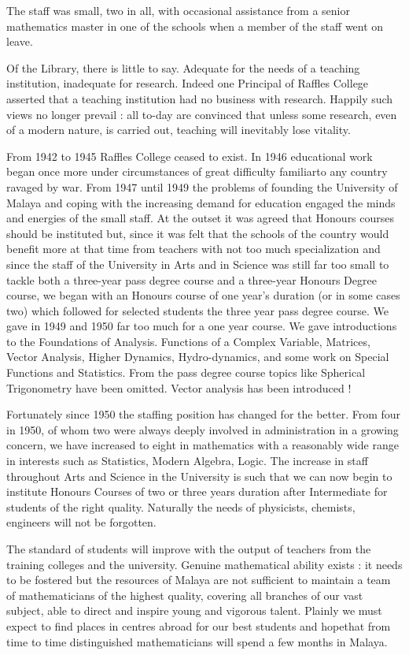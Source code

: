 The staff was small, two in all, with occasional assistance from a senior mathematics master in one of the schools when a member of the staff went on leave.

Of the Library, there is little to say. Adequate for the needs of a teaching institution, inadequate for research. Indeed one Principal of Raffles College asserted that a teaching institution had no business with research. Happily such views no longer prevail : all to-day are convinced that unless some research, even of a modern nature, is carried out, teaching will inevitably lose vitality.

From 1942 to 1945 Raffles College ceased to exist. In 1946 educational work began once more under circumstances of great difficulty familiar\pageoriginale to any country ravaged by war. From 1947 until 1949 the problems of founding the University of Malaya and coping with the increasing demand for education engaged the minds and energies of the small staff. At the outset it was agreed that Honours courses should be instituted but, since it was felt that the schools of the country would benefit more at that time from teachers with not too much specialization and since the staff of the University in Arts and in Science was still far too small to tackle both a three-year pass degree course and a three-year Honours Degree course, we began with an Honours course of one year's duration (or in some cases two) which followed for selected students the three year pass degree course. We gave in 1949 and 1950 far too much for a one year course. We gave introductions to the Foundations of Analysis. Functions of a Complex Variable, Matrices, Vector Analysis, Higher Dynamics, Hydro-dynamics, and some work on Special Functions and Statistics. From the pass degree course topics like Spherical Trigonometry have been omitted. Vector analysis has been introduced !

Fortunately since 1950 the staffing position has changed for the better. From four in 1950, of whom two were always deeply involved in administration in a growing concern, we have increased to eight in mathematics with a reasonably wide range in interests such as Statistics, Modern Algebra, Logic. The increase in staff throughout Arts and Science in the University is such that we can now begin to institute Honours Courses of two or three years duration after Intermediate for students of the right quality. Naturally the needs of physicists, chemists, engineers will not be forgotten.

The standard of students will improve with the output of teachers from the training colleges and the university. Genuine mathematical ability exists : it needs to be fostered but the resources of Malaya are not sufficient to maintain a team of mathematicians of the highest quality, covering all branches of our vast subject, able to direct and inspire young and vigorous talent. Plainly we must expect to find places in centres abroad for our best students and hope\pageoriginale that from time to time distinguished mathematicians will spend a few months in Malaya.

